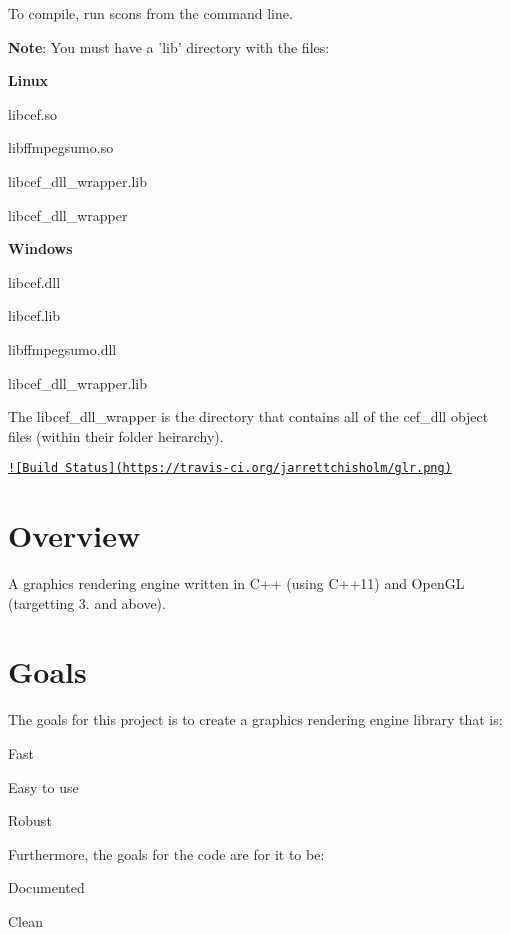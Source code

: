 To compile, run {\ttfamily scons} from the command line.

{\bfseries Note}\-: You must have a 'lib' directory with the files\-:

{\bfseries Linux}


\begin{DoxyItemize}
\item libcef.\-so
\item libffmpegsumo.\-so
\item libcef\-\_\-dll\-\_\-wrapper.\-lib
\item libcef\-\_\-dll\-\_\-wrapper
\end{DoxyItemize}

{\bfseries Windows}


\begin{DoxyItemize}
\item libcef.\-dll
\item libcef.\-lib
\item libffmpegsumo.\-dll
\item libcef\-\_\-dll\-\_\-wrapper.\-lib
\end{DoxyItemize}

The libcef\-\_\-dll\-\_\-wrapper is the directory that contains all of the cef\-\_\-dll object files (within their folder heirarchy).

\href{https://travis-ci.org/jarrettchisholm/glr}{\tt !\mbox{[}Build Status\mbox{]}(https\-://travis-\/ci.\-org/jarrettchisholm/glr.\-png)}

\section*{Overview}

A graphics rendering engine written in C++ (using C++11) and Open\-G\-L (targetting 3. and above).

\section*{Goals}

The goals for this project is to create a graphics rendering engine library that is\-:
\begin{DoxyItemize}
\item Fast
\item Easy to use
\item Robust
\end{DoxyItemize}

Furthermore, the goals for the code are for it to be\-:
\begin{DoxyItemize}
\item Documented
\item Clean
\end{DoxyItemize}

